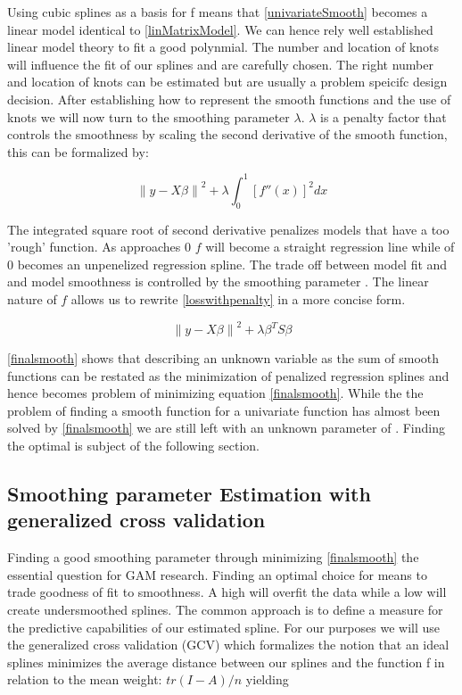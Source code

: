 \documentclass{article}
\begin{document}
    Using cubic splines as a basis for f means that \ref{univariateSmooth} becomes a linear model identical to \ref{linMatrixModel}. We can hence rely well established linear model theory to fit a good polynmial. The number and location of knots will influence the fit of our splines and are carefully chosen. The right number and location of knots can be estimated but are usually a problem speicifc design decision. After establishing how to represent the smooth functions and the use of knots we will now turn to the smoothing parameter $\lambda$. $\lambda$ is a penalty factor that controls the smoothness by scaling the second derivative of the smooth function, this can be formalized by:

    \begin{equation} \label{losswithpenalty} \left \| y - X\beta  \right \|^2 + \lambda \int_{0}^{1} [{f}''(x)]^2 dx \end{equation}

    The integrated square root of second derivative penalizes models that have a too 'rough' function. As \textlambda approaches 0 $f$ will become a straight regression line while \textlambda of 0 becomes an unpenelized regression spline. The trade off between model fit and and model smoothness is controlled by the smoothing parameter \textlambda. The linear nature of $f$ allows us to rewrite \ref{losswithpenalty} in a more concise form.

    \begin{equation} \label{finalsmooth} \left \| y - X\beta  \right \|^2 + \lambda \beta^T S\beta  \end{equation}

    \ref{finalsmooth} shows that describing an unknown variable as the sum of smooth functions can be restated as the minimization of penalized regression splines and hence becomes problem of minimizing equation \ref{finalsmooth}. While the the problem of finding a smooth function for a univariate function has almost been solved by \ref{finalsmooth} we are still left with an unknown parameter of \textlambda. Finding the optimal \textlambda is subject of the following section.

    \subsection{Smoothing parameter Estimation with generalized cross validation}
    Finding a good smoothing parameter through minimizing \ref{finalsmooth} the essential question for GAM research. Finding an optimal choice for \textlambda means to trade goodness of fit to smoothness. A high \textlambda will overfit the data while a low \textlambda will create undersmoothed splines. The common approach is to define a measure for the predictive capabilities of our estimated spline. For our purposes we will use the generalized cross validation (GCV) which formalizes the notion that an ideal splines minimizes the average distance between our splines and the function f in relation to the mean weight: $tr(I-A)/n$ yielding
\end{document}
